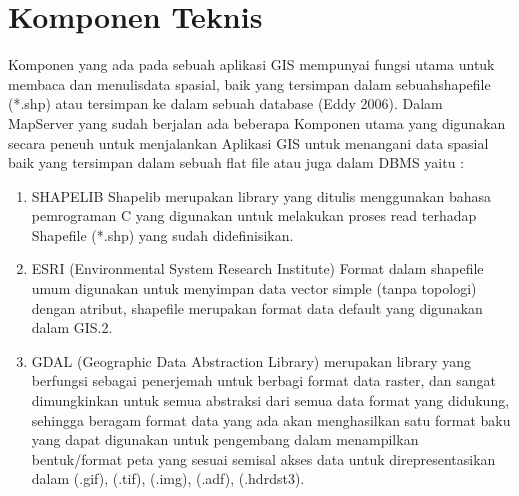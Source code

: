 \section{Komponen Teknis}
Komponen yang ada pada sebuah aplikasi GIS mempunyai fungsi utama untuk membaca dan menulisdata spasial, baik yang tersimpan dalam sebuahshapefile (*.shp) atau tersimpan ke dalam sebuah database (Eddy 2006).
Dalam MapServer yang sudah berjalan ada beberapa Komponen utama yang digunakan secara peneuh untuk menjalankan Aplikasi GIS untuk menangani data spasial baik yang tersimpan dalam sebuah flat file atau juga dalam DBMS yaitu :
\begin{enumerate}
\item SHAPELIB
\subitem Shapelib merupakan library yang ditulis menggunakan bahasa pemrograman C yang digunakan untuk melakukan proses read terhadap Shapefile (*.shp) yang sudah didefinisikan. 

\item ESRI (Environmental System Research Institute)
\subitem Format dalam shapefile umum digunakan untuk menyimpan data vector simple (tanpa topologi) dengan atribut, shapefile merupakan format data default yang digunakan dalam GIS.2.

\item GDAL (Geographic Data Abstraction Library) 
\subitem merupakan library yang berfungsi sebagai penerjemah untuk berbagi format data raster, dan sangat dimungkinkan untuk semua abstraksi dari semua data format yang didukung, sehingga beragam format data yang ada akan menghasilkan satu format baku yang dapat digunakan untuk pengembang dalam menampilkan bentuk/format peta yang sesuai semisal akses data untuk direpresentasikan dalam (.gif), (.tif), (.img), (.adf), (.hdrdst3).



\end{enumerate}
